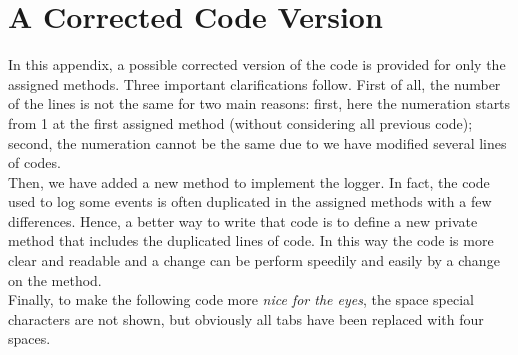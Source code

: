\documentclass[\mainpath/main]{subfiles}
\begin{document}
\chapter{A Corrected Code Version} %
\label{AppendixB:Correction}

\setmyfancystyle

In this appendix, a possible corrected version of the code is provided for only the assigned methods. Three important clarifications follow. First of all, the number of the lines is not the same for two main reasons: first, here the numeration starts from 1 at the first assigned method (without considering all previous code); second, the numeration cannot be the same due to we have modified several lines of codes.\\
Then, we have added a new method to implement the logger. In fact, the code used to log some events is often duplicated in the assigned methods with a few differences. Hence, a better way to write that code is to define a new private method that includes the duplicated lines of code. In this way the code is more clear and readable and a change can be perform speedily and easily by a change on the method.\\
Finally, to make the following code more \textit{nice for the eyes}, the space special characters are not shown, but obviously all tabs have been replaced with four spaces.


\end{document}

